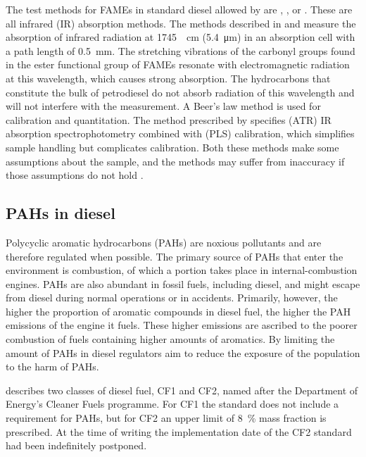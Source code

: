 The test methods for FAMEs in standard diesel allowed by  are
, , or . These are all infrared
(IR) absorption methods. The methods described in  and  measure the absorption of infrared radiation at
\SI{1745}{\per\centi\metre} (\SI{5.4}{\micro\metre}) in an absorption cell with
a path length of \SI{0.5}{\milli\metre}. The stretching vibrations of the
carbonyl groups found in the ester functional group of FAMEs resonate with
electromagnetic radiation at this wavelength, which causes strong absorption.
The hydrocarbons that constitute the bulk of petrodiesel do not absorb radiation
of this wavelength and will not interfere with the measurement. A Beer's law
method is used for calibration and quantitation. The method prescribed by
 specifies  (ATR) IR
absorption spectrophotometry combined with  (PLS)
calibration, which simplifies sample handling but complicates calibration. Both
these methods make some assumptions about the sample, and the methods may suffer
from inaccuracy if those assumptions do not hold \autocite{Pinho2014}.

\subsection{PAHs in diesel} 

Polycyclic aromatic hydrocarbons (PAHs) are noxious pollutants and are therefore
regulated when possible. The primary source of PAHs that enter the environment is
combustion, of which a portion takes place in internal-combustion engines. PAHs
are also abundant in fossil fuels, including diesel, and might escape from
diesel during normal operations or in accidents. Primarily, however, the higher
the proportion of aromatic compounds in diesel fuel, the higher the PAH
emissions of the engine it fuels. These higher emissions are ascribed to the
poorer combustion of fuels containing higher amounts of aromatics. By limiting
the amount of PAHs in diesel regulators aim to reduce the exposure of the
population to the harm of PAHs.

 describes two classes of diesel fuel, CF1 and CF2, named after the
Department of Energy's Cleaner Fuels programme. For CF1 the standard does not
include a requirement for PAHs, but for CF2 an upper limit of \SI{8}{\percent}
mass fraction is prescribed. At the time of writing the implementation date of
the CF2 standard had been indefinitely postponed. 

